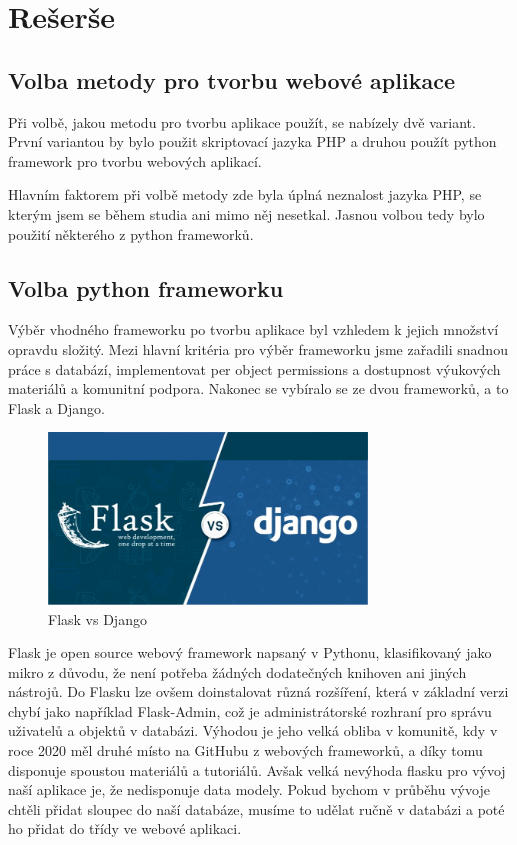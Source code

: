 \chapter{Rešerše}
\label{1-reserse}

\section{Volba metody pro tvorbu webové aplikace}


Při volbě, jakou metodu pro tvorbu aplikace použít, se nabízely dvě variant. První variantou by bylo použit skriptovací jazyka PHP a druhou použít python framework pro tvorbu webových aplikací. 

Hlavním faktorem při volbě metody zde byla úplná neznalost jazyka PHP, se kterým jsem se během studia ani mimo něj nesetkal. Jasnou volbou tedy bylo použití některého z python frameworků. 

\section{Volba python frameworku}
Výběr vhodného frameworku po tvorbu aplikace byl vzhledem k jejich množství opravdu složitý. Mezi hlavní kritéria pro výběr frameworku jsme zařadili snadnou práce s databází, implementovat per object permissions a dostupnost výukových materiálů a komunitní podpora. Nakonec se vybíralo se ze dvou frameworků, a to Flask a Django.

\begin{figure}[H] \centering
    \includegraphics[width=240pt]{./pictures/1-django-vs-flask.jpeg}
    \caption[Flask vs Django]{Flask vs Django \cite{}}
	\label{fig:Flask vs Django}                                
\end{figure}

Flask je open source webový framework napsaný v Pythonu, klasifikovaný jako mikro z důvodu, že není potřeba žádných dodatečných knihoven ani jiných nástrojů. Do Flasku lze ovšem doinstalovat různá rozšíření, která v základní verzi chybí jako například Flask-Admin, což je administrátorské rozhraní pro správu uživatelů a objektů v databázi. Výhodou je jeho velká obliba v komunitě, kdy v roce 2020 měl druhé místo na GitHubu z webových frameworků, a díky tomu disponuje spoustou materiálů a tutoriálů. Avšak velká nevýhoda flasku pro vývoj naší aplikace je, že nedisponuje data modely. Pokud bychom v průběhu vývoje chtěli přidat sloupec do naší databáze, musíme to udělat ručně v databázi a poté ho přidat do třídy ve webové aplikaci.

